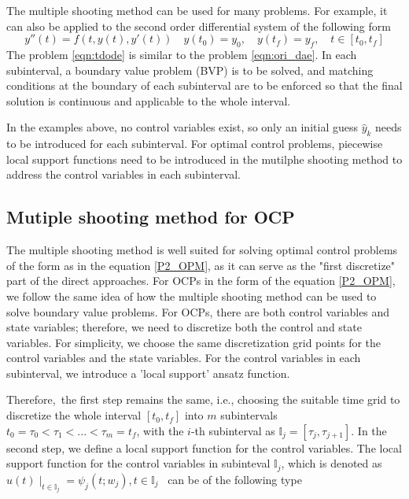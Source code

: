 \documentclass  [
  paper    = a4,
  BCOR     = 10mm,
  twoside,
  fontsize = 12pt,
  fleqn,
  toc      = bibnumbered,
  toc      = listofnumbered,
  numbers  = noendperiod,
  headings = normal,
  listof   = leveldown,
  version  = 3.03
]                                       {scrreprt}
\newcommand{\<}{\langle}
\renewcommand{\>}{\rangle}
\begin{document}
The multiple shooting method can be used for many problems. For example, it can also be applied to the second order differential system of the following form 
\begin{equation}
	y''(t) = f(t, y(t), y'(t))  \quad y(t_0) = y_0, \quad y(t_f) = y_f,  \quad t \in [t_0, t_f]
	\label{eqn:tdode}
\end{equation}
The problem \ref{eqn:tdode} is similar to the problem \ref{eqn:ori_dae}. In each subinterval, a boundary value problem (BVP) is to be solved, and matching conditions at the boundary of each subinterval are to be enforced so that the final solution is continuous and applicable to the whole interval.

In the examples above, no control variables exist, so only an initial guess $\hat{y}_k$ needs to be introduced for each subinterval. For optimal control problems, piecewise local support functions need to be introduced in the mutilphe shooting method to address the control variables in each subinterval.

\subsection{Mutiple shooting method for OCP}
\label{Sec_MS_OCP}
The multiple shooting method is well suited for solving optimal control problems of the form as in the equation \ref{P2_OPM}, as it can serve as the "first discretize" part of the direct approaches. For OCPs in the form of the equation \ref{P2_OPM}, we follow the same idea of how the multiple shooting method can be used to solve boundary value problems. For OCPs, there are both control variables and state variables; therefore, we need to discretize both the control and state variables. For simplicity, we choose the same discretization grid points for the control variables and the state variables. For the control variables in each subinterval, we introduce a 'local support' ansatz function. 

Therefore, the first step remains the same, i.e., choosing the suitable time grid to discretize the whole interval $[t_0, t_f]$ into $m$ subintervals $t_0 = \tau_0 < \tau_1 < ... < \tau_m = t_f$, with the $i$-th subinterval as $\mathbb{I}_j = [\tau_j, \tau_{j+1}]$. In the second step, we define a local support function for the control variables. The local support function for the control variables in subinteval $\mathbb{I}_j$, which is denoted as  $u(t) \mid_{t \in \mathbb{I}_j} = \psi_j(t;w_j), t \in \mathbb{I}_j$  can be of the following type
\end{document}
